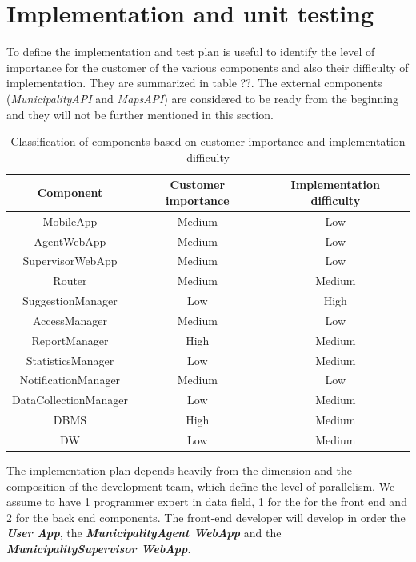 \documentclass[a4paper]{report}
\begin{document}
\section{Implementation and unit testing}
To define the implementation and test plan is useful to identify the level of importance for the customer of the various components and also their difficulty of implementation. They are summarized in table ??. The external components (\textit{MunicipalityAPI} and \textit{MapsAPI}) are considered to be ready from the beginning and they will not be further mentioned in this section.\\
\begin{table}[H]  
  \centering
  \bgroup
  \def\arraystretch{1.5}%
  \begin{tabular}{|c|c|c|}
    \cline{1-3}
    \textbf{Component} & \textbf{Customer importance} & \textbf{Implementation difficulty} \\ \hline
    MobileApp & Medium & Low   \\ \hline
    AgentWebApp & Medium & Low   \\ \hline
    SupervisorWebApp & Medium & Low   \\ \hline
    Router & Medium & Medium   \\ \hline
    SuggestionManager & Low & High   \\ \hline
    AccessManager & Medium & Low   \\ \hline
    ReportManager & High & Medium   \\ \hline
    StatisticsManager & Low & Medium   \\ \hline
    NotificationManager & Medium & Low   \\ \hline
    DataCollectionManager & Low & Medium   \\ \hline
    DBMS & High & Medium   \\ \hline
    DW & Low & Medium   \\ \hline
    
  \end{tabular}
  \egroup
  \caption{Classification of components based on customer importance and implementation difficulty}
\end{table}
The implementation plan depends heavily from the dimension and the composition of the development team, which define the level of parallelism.
We assume to have 1 programmer expert in data field, 1 for the for the front end and 2 for the back end components.
The front-end developer will develop in order the \textbf{\textit{User App}}, the \textbf{\textit{MunicipalityAgent WebApp}} and the \textbf{\textit{MunicipalitySupervisor WebApp}}.\\
\end{document}
